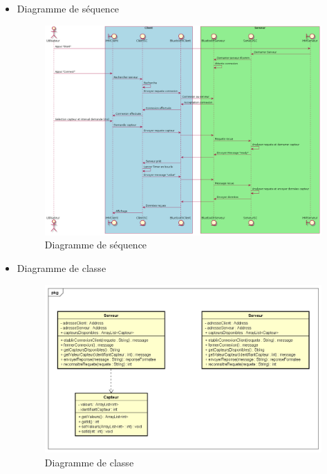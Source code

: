 \begin{itemize}
\item Diagramme de séquence
	\begin{figure}[H]
		\centering
		\includegraphics[angle=90, scale=0.43]{./images/diagrammeSequence.png}
		\caption{Diagramme de séquence}
	\end{figure}
\newpage
\item Diagramme de classe
	\begin{figure}[H]
		\centering
		\includegraphics[scale=0.6]{./images/ClassDiagram.png}
		\caption{Diagramme de classe}
	\end{figure}
\end{itemize}